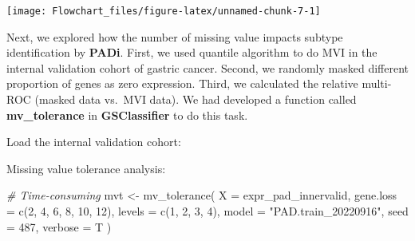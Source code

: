 \documentclass[
  12pt,
]{book}
\newenvironment{Shaded}{\begin{snugshade}}{\end{snugshade}}
\newcommand{\AttributeTok}[1]{\textcolor[rgb]{0.77,0.63,0.00}{#1}}
\newcommand{\CommentTok}[1]{\textcolor[rgb]{0.56,0.35,0.01}{\textit{#1}}}
\newcommand{\DecValTok}[1]{\textcolor[rgb]{0.00,0.00,0.81}{#1}}
\newcommand{\FloatTok}[1]{\textcolor[rgb]{0.00,0.00,0.81}{#1}}
\newcommand{\FunctionTok}[1]{\textcolor[rgb]{0.00,0.00,0.00}{#1}}
\newcommand{\NormalTok}[1]{#1}
\newcommand{\OtherTok}[1]{\textcolor[rgb]{0.56,0.35,0.01}{#1}}
\newcommand{\SpecialCharTok}[1]{\textcolor[rgb]{0.00,0.00,0.00}{#1}}
\newcommand{\StringTok}[1]{\textcolor[rgb]{0.31,0.60,0.02}{#1}}
\begin{document}
\begin{center}\texttt{[image: Flowchart\_files/figure-latex/unnamed-chunk-7-1]} \end{center}

Next, we explored how the number of missing value impacts subtype identification by \textbf{PADi}. First, we used quantile algorithm to do MVI in the internal validation cohort of gastric cancer. Second, we randomly masked different proportion of genes as zero expression. Third, we calculated the relative multi-ROC (masked data vs.~MVI data). We had developed a function called \textbf{mv\_tolerance} in \textbf{GSClassifier} to do this task.

Load the internal validation cohort:

\begin{Shaded}
\end{Shaded}

Missing value tolerance analysis:

\begin{Shaded}
\begin{Highlighting}[]
\CommentTok{\# Time{-}consuming}
\NormalTok{mvt }\OtherTok{\textless{}{-}} \FunctionTok{mv\_tolerance}\NormalTok{(}
  \AttributeTok{X =}\NormalTok{ expr\_pad\_innervalid,}
  \AttributeTok{gene.loss =} \FunctionTok{c}\NormalTok{(}\DecValTok{2}\NormalTok{, }\DecValTok{4}\NormalTok{, }\DecValTok{6}\NormalTok{, }\DecValTok{8}\NormalTok{, }\DecValTok{10}\NormalTok{, }\DecValTok{12}\NormalTok{),}
  \AttributeTok{levels =} \FunctionTok{c}\NormalTok{(}\DecValTok{1}\NormalTok{, }\DecValTok{2}\NormalTok{, }\DecValTok{3}\NormalTok{, }\DecValTok{4}\NormalTok{),}
  \AttributeTok{model =} \StringTok{"PAD.train\_20220916"}\NormalTok{,}
  \AttributeTok{seed =} \DecValTok{487}\NormalTok{,}
  \AttributeTok{verbose =}\NormalTok{ T}
\NormalTok{)}
\end{Highlighting}
\end{Shaded}
\end{document}
